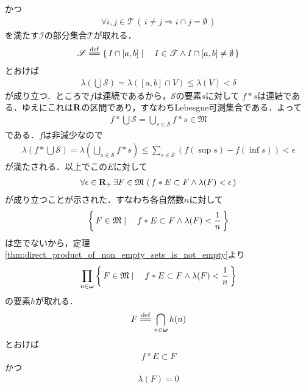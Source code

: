 \begin{sketch}
		かつ
		\begin{align}
			\forall i,j \in \mathscr{T}\, (\, i \neq j \Longrightarrow i \cap j = \emptyset\, )
		\end{align}
		を満たす$\mathscr{I}$の部分集合$\mathscr{T}$が取れる．
		\begin{align}
			\mathscr{S} \defeq \Set{I \cap [a,b]}{I \in \mathscr{T} \wedge I \cap [a,b] \neq \emptyset}
		\end{align}
		とおけば
		\begin{align}
			\lambda\left(\bigcup \mathscr{S}\right)
			= \lambda\left([a,b] \cap V\right) \leq \lambda(V) < \delta
		\end{align}
		が成り立つ．ところで$f$は連続であるから，$\mathscr{S}$の要素$s$に対して
		$f \ast s$は連結である．ゆえにこれは$\mathbf{R}$の区間であり，すなわちLebesgue可測集合である．よって
		\begin{align}
			f \ast \bigcup \mathscr{S} = \bigcup_{s \in \mathscr{S}} f \ast s \in \mathfrak{M}
		\end{align}
		である．$f$は非減少なので
		\begin{align}
			\lambda\left(f \ast \bigcup \mathscr{S}\right)
			= \lambda\left(\bigcup_{s \in \mathscr{S}} f \ast s\right)
			\leq \sum_{s \in \mathscr{S}} \left(f(\sup{}{s}) - f(\inf{}{s})\right)
			< \epsilon
		\end{align}
		が満たされる．以上でこの$E$に対して
		\begin{align}
			\forall \epsilon \in \mathbf{R}_+\, \exists F \in \mathfrak{M}\,
			\left(\, f \ast E \subset F \wedge \lambda(F) < \epsilon\, \right)
		\end{align}
		が成り立つことが示された．すなわち各自然数$n$に対して
		\begin{align}
			\left\{\, F \in \mathfrak{M} \mid \quad f \ast E \subset F \wedge \lambda(F) < \frac{1}{n}\, \right\}
		\end{align}
		は空でないから，定理\ref{thm:direct_product_of_non_empty_sets_is_not_empty}より
		\begin{align}
			\prod_{n \in {\boldsymbol \omega}} \left\{\, F \in \mathfrak{M} \mid \quad f \ast E \subset F \wedge \lambda(F) < \frac{1}{n}\, \right\}
		\end{align}
		の要素$h$が取れる．
		\begin{align}
			F \defeq \bigcap_{n \in \Natural} h(n)
		\end{align}
		とおけば
		\begin{align}
			f \ast E \subset F
		\end{align}
		かつ
		\begin{align}
			\lambda(F) = 0

\end{align}
\end{sketch}
